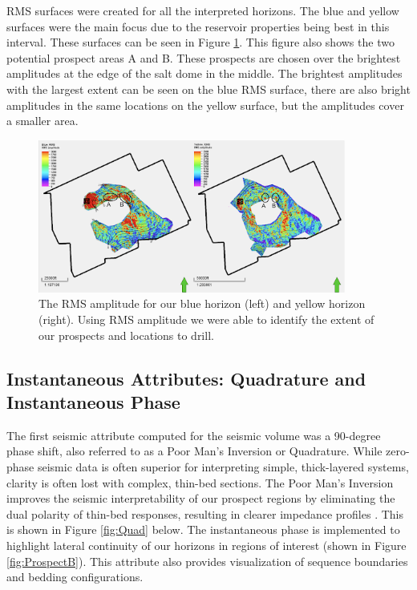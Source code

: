 \documentclass[fleqn]{article}
\begin{document}
RMS surfaces were created for all the interpreted horizons. The blue and yellow surfaces were the main focus due to the reservoir properties being best in this interval. These surfaces can be seen in Figure \ref{fig:RMS}. This figure also shows the two potential prospect areas A and B. These prospects are chosen over the brightest amplitudes at the edge of the salt dome in the middle. The brightest amplitudes with the largest extent can be seen on the blue RMS surface, there are also bright amplitudes in the same locations on the yellow surface, but the amplitudes cover a smaller area.

\begin{figure}[H]
    \centering
    \includegraphics[width=0.9\textwidth]{Images/RMS Surfaces.png}
    \caption{The RMS amplitude for our blue horizon (left) and yellow horizon (right). Using RMS amplitude we were able to identify the extent of our prospects and locations to drill.}
    \label{fig:RMS}
\end{figure}

\subsection{Instantaneous Attributes: Quadrature and Instantaneous Phase}

The first seismic attribute computed for the seismic volume was a 90-degree phase shift, also referred to as a Poor Man’s Inversion or Quadrature. While zero-phase seismic data is often superior for interpreting simple, thick-layered systems, clarity is often lost with complex, thin-bed sections. The Poor Man’s Inversion improves the seismic interpretability of our prospect regions by eliminating the dual polarity of thin-bed responses, resulting in clearer impedance profiles \cite{Zeng}. This is shown in Figure \ref{fig:Quad} below. The instantaneous phase is implemented to highlight lateral continuity of our horizons in regions of interest (shown in Figure \ref{fig:ProspectB}). This attribute also provides visualization of sequence boundaries and bedding configurations.
\end{document}
